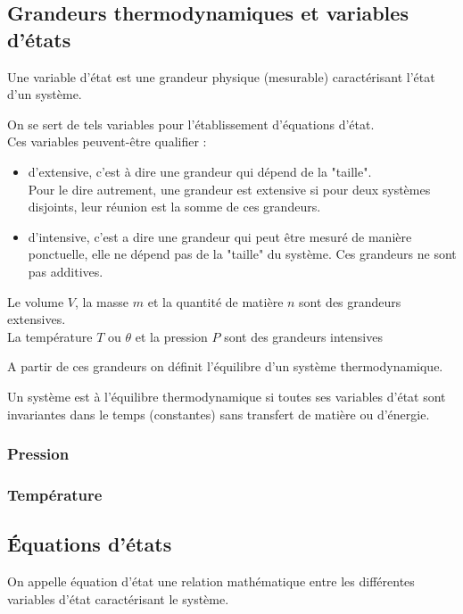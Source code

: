 \subsection{Grandeurs thermodynamiques et variables d'états}
\begin{defi}
Une variable d'état est une grandeur physique (mesurable) caractérisant l'état d'un système.
\end{defi}
On se sert de tels variables pour l'établissement d'équations d'état.\\
\newline
Ces variables peuvent-être qualifier :
\begin{itemize}
    \item d'extensive, c'est à dire une grandeur qui dépend de la "taille".\\
    Pour le dire autrement, une grandeur est extensive si pour deux systèmes disjoints, leur réunion est la somme de ces grandeurs.
    \item d'intensive, c'est a dire une grandeur qui peut être mesuré de manière ponctuelle, elle ne dépend pas de la "taille" du système. Ces grandeurs ne sont pas additives.
\end{itemize}
\begin{ex}
Le volume $V$, la masse $m$ et la quantité de matière $n$ sont des grandeurs extensives.\\
La température $T$ ou $\theta$ et la pression $P$ sont des grandeurs intensives
\end{ex}
A partir de ces grandeurs on définit l'équilibre d'un système thermodynamique.
\begin{defi}
Un système est à l'équilibre thermodynamique si toutes ses variables d'état sont invariantes dans le temps (constantes) sans transfert de matière ou d'énergie.
\end{defi}
\subsubsection{Pression}
\subsubsection{Température}
\subsection{Équations d'états}
\begin{defi}
On appelle équation d'état une relation mathématique entre les différentes variables d'état caractérisant le système.
\end{defi}
